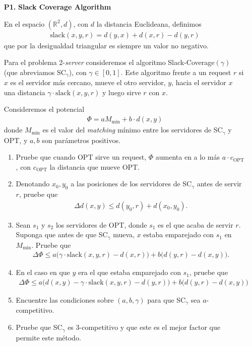\documentclass[11pt, spanish]{article}
\theoremstyle{plain}
\newcommand{\R}{\mathds{R}}
\newcommand{\SL}{\text{slack}}
\begin{document}
\begin{itemize}
  \item[\textbf{P1.}] \textbf{Slack Coverage Algorithm}

	  En el espacio $(\R^2,d)$, con $d$ la distancia Euclideana, definimos
	  \begin{align*}
		 \SL(x,y,r) = d(y,x) + d(x,r) - d(y,r) 
	  \end{align*}
	  que por la desigualdad triangular es siempre un valor no negativo.

	  Para el problema 2-\textit{server} consideremos el algoritmo
	  Slack-Coverage$(\gamma)$ (que abreviamos SC$_\gamma$), con
	  $\gamma\in [0,1]$. Este algoritmo frente a un request $r$
	  si $x$ es el servidor más cercano, mueve el otro servidor, $y$,
	  hacia el servidor $x$ una distancia $\gamma\cdot \SL(x,y,r)$ y luego
	  sirve $r$ con $x$.

	  Consideremos el potencial
	  \begin{align*}
		  \Phi = a M_{\min} + b\cdot d(x,y)
	  \end{align*}
	  donde $M_{\min}$ es el valor del \textit{matching} mínimo
	  entre los servidores de SC$_{\gamma}$ y OPT, y $a,b$ son 
	  parámetros positivos.

	  \begin{enumerate}
		  \item Pruebe que cuando OPT sirve un request, $\Phi$ 
			  aumenta en a lo más $a\cdot c_{\text{OPT}}$, con
			  $c_{\text{OPT}}$ la distancia que mueve OPT.
		  \item Denotando $x_0, y_0$ a las posiciones de los 
			  servidores de SC$_\gamma$ antes de servir $r$,
			  pruebe que
			  \begin{align*}
				  \Delta d(x,y) \leq d(y_0,r) + d(x_0,y_0).
			  \end{align*}
		  \item Sean $s_1$ y $s_2$ los servidores de OPT, donde $s_1$ es
			  el que acaba de servir $r$. Suponga que antes de que SC$_{\gamma}$
			  mueva, $x$ estaba emparejado con $s_1$ en $M_{\min}$.
			  Pruebe que
			  \begin{align*}
				  \Delta \Phi\leq a\big( \gamma\cdot \SL(x,y,r)-d(x,r) \big)
				  +b \big( d(y,r) - d(x,y) \big).
			  \end{align*}
		  \item En el caso en que $y$ era el que estaba emparejado con $s_1$, pruebe
			  que
			  \begin{align*}
				  \Delta \Phi \leq a\big( d(x,y) - \gamma \cdot\SL(x,y,r) - d(y,r) \big)
				  + b\big( d(y,r) - d(x,y) \big)
			  \end{align*}
		  \item Encuentre las condiciones sobre $(a,b,\gamma)$ para que 
			  SC$_{\gamma}$ sea $a$-competitivo.
		  \item Pruebe que SC$_{\gamma}$ es 3-competitivo y que este es
			  el mejor factor que permite este m\'etodo.
	  \end{enumerate}

    
    
\end{itemize}
\end{document}
